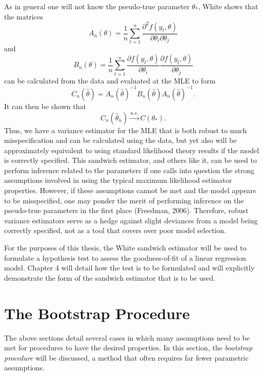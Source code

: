 		As in general one will not know the pseudo-true parameter $\theta_*$, White shows that the matrices
		\begin{equation*}
			A_n(\theta) = \frac{1}{n} \sum_{t=1}^{n} \frac{\partial^2 f(y_t,\theta)}{\partial \theta_i \partial \theta_j}
		\end{equation*}
		and
		\begin{equation*}
			B_n(\theta) = \frac{1}{n} \sum_{t=1}^{n} \frac{\partial f(y_t,\theta)}{\partial \theta_i} \frac{\partial f(y_t,\theta)}{\partial \theta_j} 
		\end{equation*}
		can be calculated from the data and evaluated at the MLE to form
		\begin{equation*}
			C_n(\hat{\theta}) = A_n(\hat{\theta})^{-1} B_n(\hat{\theta}) A_n(\hat{\theta})^{-1} .
		\end{equation*}
		It can then be shown that 
		\begin{equation*}
			C_n(\hat{\theta}_n) \xrightarrow[]{a.s.} C(\theta_* ) .
		\end{equation*}
		Thus, we have a variance estimator for the MLE that is both robust to much misspecification and can be calculated using the data, but yet also will be approximately equivalent to using standard
		likelihood theory results if the model is correctly specified. This sandwich estimator, and others like it, can be used to perform inference related to the parameters if one calls into question
		the strong assumptions involved in using the typical maximum likelihood estimator properties. However, if these assumptions cannot be met and the model appears to be misspecified, one may ponder
		the merit of performing inference on the pseudo-true parameters in the first place (Freedman, 2006). Therefore, robust variance estimators serve as a hedge against slight deviances from a model
		being correctly specified, not as a tool that covers over poor model selection.

		For the purposes of this thesis, the White sandwich estimator will be used to formulate a hypothesis test to assess the goodness-of-fit of a linear regression model. Chapter 4 will detail how
		the test is to be formulated and will explicitly demonstrate the form of the sandwich estimator that is to be used.

		\section{The Bootstrap Procedure}

		The above sections detail several cases in which many assumptions need to be met for procedures to have the desired properties. In this section, the \textit{bootstrap procedure} will
		be discussed, a method that often requires far fewer parametric assumptions.
		
